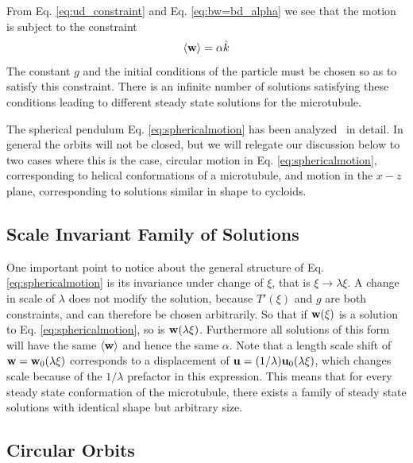 \documentclass[11pt]{ucthesis}
\def\bu{{\bf u}}
\def\bw{{\bf w}}
\begin{document}
From Eq. \ref{eq:ud_constraint} and Eq. \ref{eq:bw=bd_alpha} we see that the motion is subject to the
constraint
\begin{equation}
\label{eq:alpha_constraint}
\langle \bw \rangle = \alpha {\hat k}
\end{equation}
The constant $g$ and the initial conditions of the particle must be chosen so as to satisfy this constraint.
There is an infinite number of solutions satisfying these conditions leading to different 
steady state solutions for the microtubule.

The spherical pendulum Eq. \ref{eq:sphericalmotion} has been analyzed~\cite{CushmanBates} in detail. In general
the orbits will not be closed, but we will relegate
our discussion below to two cases where this is the case, circular motion in Eq. \ref{eq:sphericalmotion}, corresponding to helical
conformations of a microtubule, and motion in the $x-z$ plane, corresponding to solutions similar in shape to cycloids.

\subsection{Scale Invariant Family of Solutions}
\label{subsec:ScaleInvariance}

One important point to notice about the general structure of Eq. \ref{eq:sphericalmotion} is its invariance under
change of $\xi$, that is $\xi \rightarrow \lambda \xi$. A change in scale of $\lambda$ does not modify the
solution, because $T'(\xi)$  and $g$ are both constraints, and can therefore be chosen arbitrarily. So that if
$\bw(\xi)$ is a solution to Eq. \ref{eq:sphericalmotion}, so is $\bw(\lambda \xi)$. Furthermore all solutions
of this form will have the same $\langle \bw \rangle$ and hence the same $\alpha$. Note that a length scale
shift of $\bw = \bw_0(\lambda \xi)$ corresponds to a displacement of $\bu = (1/\lambda)\bu_0(\lambda \xi)$, which
changes scale because of the $1/\lambda$ prefactor in this expression. This means that for every
steady state conformation of the microtubule, there exists a family of steady state solutions with identical
shape but arbitrary size.

\subsection{Circular Orbits}
\label{subsec:CircularOrbits}
\end{document}
